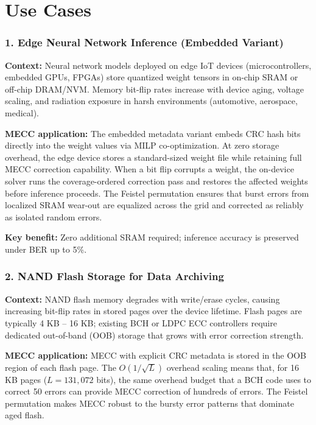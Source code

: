\chapter*{Use Cases} \label{use_cases}
\noindent

\subsection*{1. Edge Neural Network Inference (Embedded Variant)}

\textbf{Context:} Neural network models deployed on edge IoT devices (microcontrollers, embedded GPUs, FPGAs) store quantized weight tensors in on-chip SRAM or off-chip DRAM/NVM.
Memory bit-flip rates increase with device aging, voltage scaling, and radiation exposure in harsh environments (automotive, aerospace, medical).

\textbf{MECC application:} The embedded metadata variant embeds CRC hash bits directly into the weight values via MILP co-optimization.
At zero storage overhead, the edge device stores a standard-sized weight file while retaining full MECC correction capability.
When a bit flip corrupts a weight, the on-device solver runs the coverage-ordered correction pass and restores the affected weights before inference proceeds.
The Feistel permutation ensures that burst errors from localized SRAM wear-out are equalized across the grid and corrected as reliably as isolated random errors.

\textbf{Key benefit:} Zero additional SRAM required; inference accuracy is preserved under BER up to 5\%.

\subsection*{2. NAND Flash Storage for Data Archiving}

\textbf{Context:} NAND flash memory degrades with write/erase cycles, causing increasing bit-flip rates in stored pages over the device lifetime.
Flash pages are typically 4 KB -- 16 KB; existing BCH or LDPC ECC controllers require dedicated out-of-band (OOB) storage that grows with error correction strength.

\textbf{MECC application:} MECC with explicit CRC metadata is stored in the OOB region of each flash page.
The $O(1/\sqrt{L})$ overhead scaling means that, for 16 KB pages ($L = 131,072$ bits), the same overhead budget that a BCH code uses to correct 50 errors can provide MECC correction of hundreds of errors.
The Feistel permutation makes MECC robust to the bursty error patterns that dominate aged flash.

